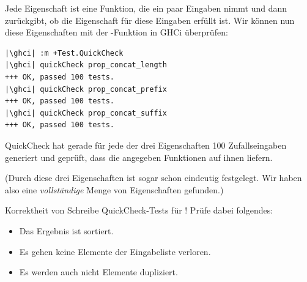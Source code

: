 \documentclass{uebblatt}
\begin{document}
Jede Eigenschaft ist eine Funktion, die ein paar Eingaben nimmt und dann
zurückgibt, ob die Eigenschaft für diese Eingaben erfüllt ist. Wir können
nun diese Eigenschaften mit der -Funktion in GHCi
überprüfen:

\begin{verbatim}
|\ghci| :m +Test.QuickCheck
|\ghci| quickCheck prop_concat_length
+++ OK, passed 100 tests.
|\ghci| quickCheck prop_concat_prefix
+++ OK, passed 100 tests.
|\ghci| quickCheck prop_concat_suffix
+++ OK, passed 100 tests.
\end{verbatim}

QuickCheck hat gerade für jede der drei Eigenschaften 100 Zufallseingaben
generiert und geprüft, dass die angegeben Funktionen auf ihnen
 liefern.

(Durch diese drei Eigenschaften ist \haskellinline{(++)} sogar schon eindeutig
festgelegt. Wir haben also eine \emph{vollständige} Menge von Eigenschaften
gefunden.)

\begin{aufgabe}{Korrektheit von }
  Schreibe QuickCheck-Tests für !
  Prüfe dabei folgendes:
  \begin{itemize}
    \item Das Ergebnis ist sortiert.
    \item Es gehen keine Elemente der Eingabeliste verloren.
    \item Es werden auch nicht Elemente dupliziert.
  \end{itemize}
\end{aufgabe}
\end{document}
